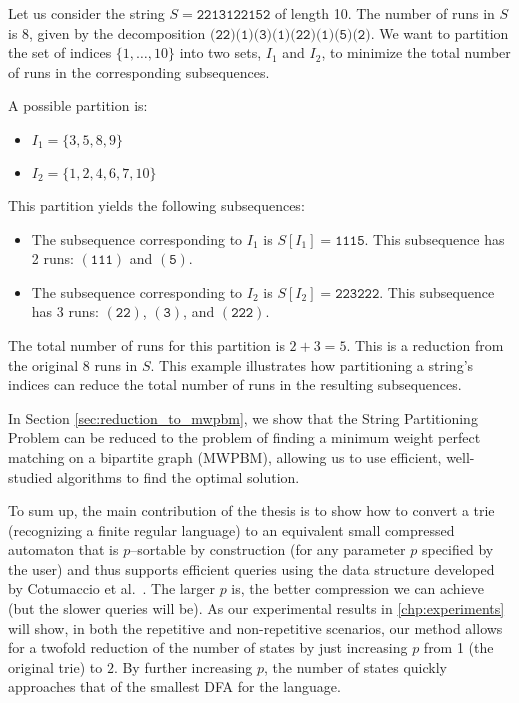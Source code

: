 \begin{example}
\label{ex:string-partitioning}
    Let us consider the string $S = \texttt{2213122152}$ of length 10. The number of runs in $S$ is 8, given by the decomposition $\texttt{(22)(1)(3)(1)(22)(1)(5)(2)}$.
    We want to partition the set of indices $\{1, \dots, 10\}$ into two sets, $I_1$ and $I_2$, to minimize the total number of runs in the corresponding subsequences.

    A possible partition is:
    \begin{itemize}
        \item $I_1 = \{3, 5, 8, 9\}$
        \item $I_2 = \{1, 2, 4, 6, 7, 10\}$
    \end{itemize}

    This partition yields the following subsequences:
    \begin{itemize}
        \item The subsequence corresponding to $I_1$ is $S[I_1] = \texttt{1115}$. This subsequence has 2 runs: $(\texttt{111})$ and $(\texttt{5})$.
        \item The subsequence corresponding to $I_2$ is $S[I_2] = \texttt{223222}$. This subsequence has 3 runs: $(\texttt{22})$, $(\texttt{3})$, and $(\texttt{222})$.
    \end{itemize}

    The total number of runs for this partition is $2 + 3 = 5$. This is a reduction from the original 8 runs in $S$. This example illustrates how partitioning a string's indices can reduce the total number of runs in the resulting subsequences.
\end{example}

In Section \ref{sec:reduction_to_mwpbm}, we show that the String Partitioning Problem can be reduced to the problem of finding a minimum weight perfect matching on a bipartite graph (MWPBM), allowing us to use efficient, well-studied algorithms to find the optimal solution. 

To sum up, the main contribution of the thesis is to show how to convert a trie (recognizing a finite regular language) to an equivalent small compressed automaton that is $p$--sortable by construction (for any parameter $p$ specified by the user) and thus supports efficient queries using the data structure developed by Cotumaccio et al.~\cite{cotumaccio2023co}. 
The larger $p$ is, the better compression we can achieve (but the slower queries will be).
As our experimental results in \cref{chp:experiments} will show, in both the repetitive and non-repetitive scenarios, our method allows for a twofold reduction of the number of states by just increasing $p$ from 1 (the original trie) to $2$. By further increasing $p$, the number of states quickly approaches that of the smallest DFA for the language. 

